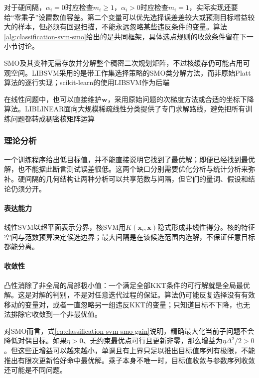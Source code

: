 对于硬间隔，$\alpha_i=0$时应检查$m_i\ge1$，$\alpha_i>0$时应检查$m_i=1$，实际实现还要给“零乘子”设置数值容差。第二个变量可以优先选择误差差较大或预测目标增益较大的样本，但必须有回退扫描，不能永远忽略某些违反条件的变量。算法\ref{alg:classification-svm-smo}给出的是共同框架，具体选点规则的收敛条件留在下一小节讨论。

SMO及其变种无需存放并分解整个稠密二次规划矩阵，不过核缓存仍可能占用可观空间。LIBSVM采用的是带工作集选择策略的SMO类分解方法，而非原始Platt算法的逐行实现；scikit-learn的使用LIBSVM作为后端

在线性问题中，也可以直接维护$\bm{w}$，采用原始问题的次梯度方法或合适的坐标下降算法。LIBLINEAR面向大规模稀疏线性分类提供了专门求解路线，避免把所有训练问题都转成稠密核矩阵运算

\subsubsection{理论分析}
\label{sec:classification-svm-analysis}

一个训练程序给出低目标值，并不能直接说明它找到了最优解；即便已经找到最优解，也不能据此断言测试误差很低。这两个缺口分别需要优化分析与统计分析来弥补。硬间隔的几何结构让两种分析可以共享范数与间隔，但它们的量词、假设和结论仍须分开。

\paragraph{表达能力}
线性SVM以超平面表示分界，核SVM用$K(\bm x_i,\bm x)$隐式形成非线性得分。核的特征空间与范数预算决定候选边界；最大间隔是在该候选范围内选解，不保证任意目标都能分离。

\paragraph{收敛性}
\label{sec:classification-svm-convergence}

凸性消除了非全局的局部极小值：一个满足全部KKT条件的可行解就是全局最优解。这是对解的判别，不是对任意迭代过程的保证。算法仍可能反复选择没有有效移动的变量对，或者一直忽略另一组违反KKT的变量；只知道目标不下降，也无法排除它收敛到一个非最优值。

对SMO而言，式\eqref{eq:classification-svm-smo-gain}说明，精确最大化当前子问题不会降低对偶目标。如果$\eta>0$、无约束最优点可行且更新非零，那么增益为$\eta\Delta^2/2>0$。但这些正增益可以越来越小，单调且有上界只足以推出目标值序列有极限，不能推出有限次更新恰好命中最优解。乘子本身不唯一时，目标值收敛与参数序列收敛还可能是不同问题。

